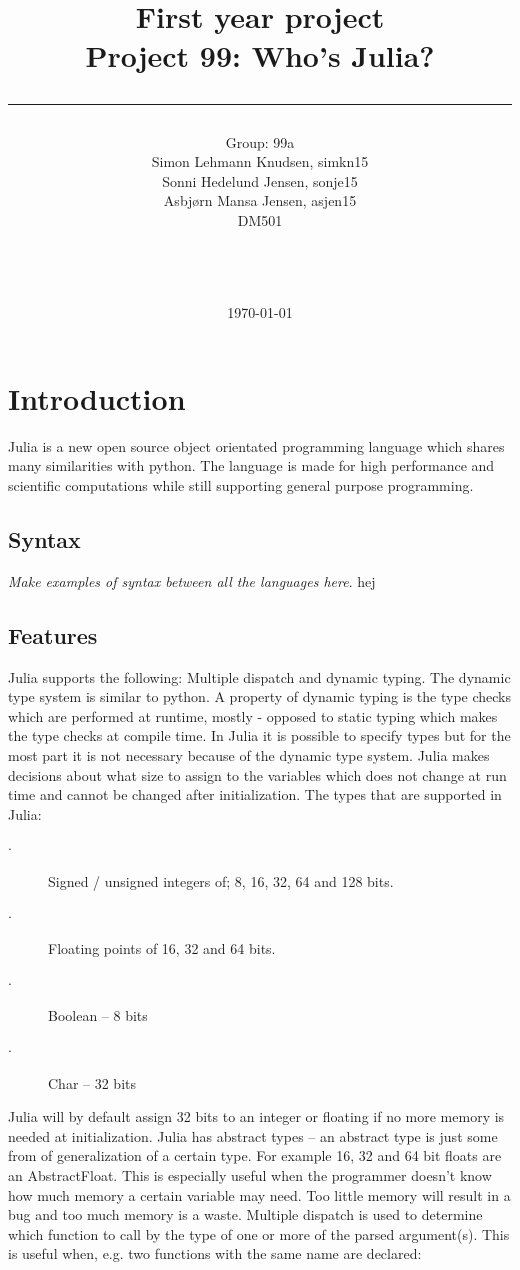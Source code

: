 \documentclass[a4paper,11pt]{article}
\title{First year project\\Project 99: Who's Julia?\\\rule{10cm}{0.5mm}}
\author{Group: 99a\\Simon Lehmann Knudsen, simkn15\\Sonni Hedelund Jensen, sonje15\\Asbjørn Mansa Jensen, asjen15
	\\ DM501\\\rule{5.5cm}{0.5mm}\\}
\date{\today}
\begin{document}
\maketitle

\vfill

\newpage
\tableofcontents

\newpage
\section{Introduction}
Julia is a new open source object orientated programming language which shares many similarities with python. The language is made for high performance and scientific computations while still supporting general purpose programming. 

\subsection{Syntax}
\textit{Make examples of syntax between all the languages here}. hej

\subsection{Features}
Julia supports the following: Multiple dispatch and dynamic typing. The dynamic type system is similar to python. A property of dynamic typing is the type checks which are performed at runtime, mostly - opposed to static typing which makes the type checks at compile time. In Julia it is possible to specify types but for the most part it is not necessary because of the dynamic type system. Julia makes decisions about what size to assign to the variables which does not change at run time and cannot be changed after initialization. The types that are supported in Julia:
\begin{description}
	\item[$\cdot$] Signed / unsigned integers of; 8, 16, 32, 64 and 128 bits.
	\item[$\cdot$] Floating points of 16, 32 and 64 bits.  
	\item[$\cdot$] Boolean – 8 bits 
	\item[$\cdot$] Char – 32 bits 
\end{description}

Julia will by default assign 32 bits to an integer or floating if no more memory is needed at initialization. Julia has abstract types – an abstract type is just some from of generalization of a certain type. For example 16, 32 and 64 bit floats are an AbstractFloat. This is especially useful when the programmer doesn't know how much memory a certain variable may need. Too little memory will result in a bug and too much memory is a waste. Multiple dispatch is used to determine which function to call by the type of one or more of the parsed argument(s). This is useful when, e.g. two functions with the same name are declared:
\end{document}
